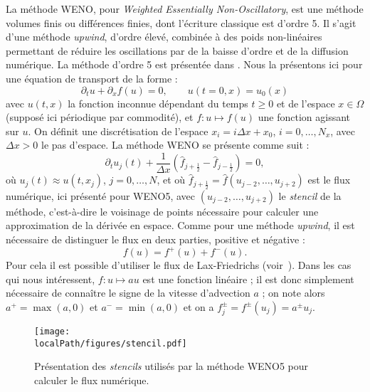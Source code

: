 La méthode WENO, pour \emph{Weighted Essentially Non-Oscillatory}, est une méthode volumes finis ou différences finies, dont l'écriture classique est d'ordre 5. Il s'agit d'une méthode \emph{upwind}, d'ordre élevé, combinée à des poids non-linéaires permettant de réduire les oscillations par de la baisse d'ordre et de la diffusion numérique. La méthode d'ordre 5 est présentée dans \cite{Liu:1994,Jiang:1996,Shu:1999,Shu:2003}. Nous la présentons ici pour une équation de transport de la forme :
\begin{equation}
  \partial_t u + \partial_x f(u) = 0,\qquad u(t=0,x) = u_0(x)
  \label{eq:0:dtudxfu}
\end{equation}
avec $u(t,x)$ la fonction inconnue dépendant du temps $t\geq 0$ et de l'espace $x\in\Omega$ (supposé ici périodique par commodité), et $f:u\mapsto f(u)$ une fonction agissant sur $u$. On définit une discrétisation de l'espace $x_i = i\Delta x + x_0$, $i=0,\dots,N_x$, avec $\Delta x>0$ le pas d'espace. La méthode WENO se présente comme suit :
$$
  \partial_t u_j(t) + \frac{1}{\Delta x}\left( \hat{f}_{j+\frac{1}{2}} - \hat{f}_{j-\frac{1}{2}} \right) = 0,
$$
où $u_j(t)\approx u(t,x_j)$, $j=0,\dots,N$, et où $\hat{f}_{j+\frac{1}{2}} = \hat{f}(u_{j-2},\dots,u_{j+2})$ est le flux numérique, ici présenté pour WENO5, avec $(u_{j-2},\dots,u_{j+2})$ le \emph{stencil} de la méthode, c'est-à-dire le voisinage de points nécessaire pour calculer une approximation de la dérivée en espace. Comme pour une méthode \emph{upwind}, il est nécessaire de distinguer le flux en deux parties, positive et négative :
$$
  f(u) = f^+(u) + f^-(u).
$$
Pour cela il est possible d'utiliser le flux de Lax-Friedrichs (voir~\cite{Shu:1997}). Dans les cas qui nous intéressent, $f:u\mapsto au$ est une fonction linéaire ; il est donc simplement nécessaire de connaître le signe de la vitesse d'advection $a$ ; on note alors $a^+ = \max(a,0)$ et $a^-=\min(a,0)$ et on a $f^\pm_j=f^\pm(u_j)=a^\pm u_j$.

\begin{figure}[h]
  \centering
  \texttt{[image: \\localPath/figures/stencil.pdf]}
  \caption{Présentation des \emph{stencils} utilisés par la méthode WENO5 pour calculer le flux numérique.}
  \label{fig:intro:stencil}
\end{figure}

